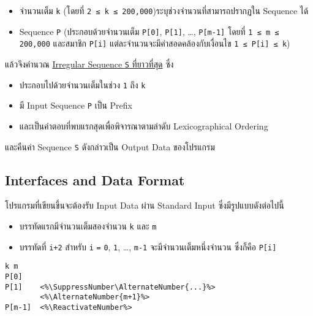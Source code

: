 \begin{itemize}[topsep=0pc,itemsep=0pt]
    \item 
        จำนวนเต็ม \lstinline{k}\: (โดยที่ \lstinline{2 ≤ k ≤ 200,000})\;ระบุช่วงจำนวนที่สามารถปรากฏใน Sequence ได้
    \item 
        Sequence \lstinline{P}\:
        (ประกอบด้วยจำนวนเต็ม \lstinline{P[0]}, \lstinline{P[1]}, \ldots, \lstinline{P[m-1]}\:
        โดยที่ \lstinline{1 ≤ m ≤ 200,000}\; 
        และสมาชิก \lstinline{P[i]} แต่ละจำนวนจะมีค่าสอดคล้องกับเงื่อนไข \lstinline{1 ≤ P[i] ≤ k})
\end{itemize}

\noindent
แล้วจึงคำนวณ \uline{Irregular Sequence \lstinline{S} ที่ยาวที่สุด} ซึ่ง 

\begin{itemize}[topsep=0pc,itemsep=0pt]
    \item 
        ประกอบไปด้วยจำนวนเต็มในช่วง \lstinline{1} ถึง \lstinline{k}
    \item
        มี Input Sequence \lstinline{P} เป็น Prefix 
    \item 
        และเป็นคำตอบที่พบแรกสุดเพื่อพิจารณาตามลำดับ Lexicographical Ordering
\end{itemize}

\noindent
และคืนค่า Sequence \lstinline{S} ดังกล่าวเป็น Output Data ของโปรแกรม


\subsection{Interfaces and Data Format}

\noindent
โปรแกรมที่เขียนขึ้นจะต้องรับ Input Data ผ่าน Standard Input ซึ่งมีรูปแบบดังต่อไปนี้

\begin{itemize}
    \item
        บรรทัดแรกมีจำนวนเต็มสองจำนวน \lstinline{k} และ \lstinline{m}
    \item 
        บรรทัดที่ \lstinline{i+2} 
        สำหรับ \lstinline{i} \lstinline{=} \lstinline{0}, \lstinline{1}, \ldots, \lstinline{m-1}
        จะมีจำนวนเต็มหนึ่งจำนวน ซึ่งก็คือ \lstinline{P[i]}
\end{itemize}

\begin{lstlisting}[aboveskip=1pc,xleftmargin=6pc]
k m
P[0]
P[1]    <%\SuppressNumber\AlternateNumber{...}%>
        <%\AlternateNumber{m+1}%>
P[m-1]  <%\ReactivateNumber%>
\end{lstlisting}

